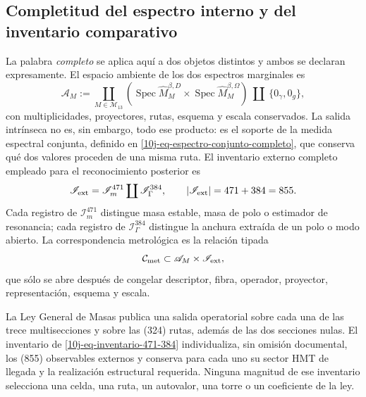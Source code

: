 \subsection{Completitud del espectro interno y del inventario comparativo}

La palabra \emph{completo} se aplica aquí a dos objetos distintos y ambos se
declaran expresamente. El espacio ambiente de los dos espectros marginales es
\begin{equation}
 \mathscr A_M:=
 \coprod_{M\in\mathcal M_{13}}
 \left(
  \operatorname{Spec}\widehat M_M^{\beta,D}
  \times
  \operatorname{Spec}\widehat M_M^{\beta,\Omega}
 \right)
 \ \coprod\ \{0_\gamma,0_g\},
 \label{10j-eq-espectro-interno-completo}
\end{equation}
con multiplicidades, proyectores, rutas, esquema y escala conservados. La
salida intrínseca no es, sin embargo, todo ese producto: es el soporte de la
medida espectral conjunta, definido en
\eqref{10j-eq-espectro-conjunto-completo}, que conserva qué dos valores
proceden de una misma ruta. El inventario externo completo empleado para el
reconocimiento posterior es
\begin{equation}
 \mathscr I_{\rm ext}
 =\mathscr I_m^{471}\coprod\mathscr I_\Gamma^{384},
 \qquad |\mathscr I_{\rm ext}|=471+384=855.
 \label{10j-eq-inventario-471-384}
\end{equation}
Cada registro de \(\mathscr I_m^{471}\) distingue masa estable, masa de polo o
estimador de resonancia; cada registro de \(\mathscr I_\Gamma^{384}\)
distingue la anchura extraída de un polo o modo abierto. La correspondencia
metrológica es la relación tipada
\begin{equation}
 \mathcal C_{\rm met}
 \subset
 \mathscr A_M\times\mathscr I_{\rm ext},
 \label{10j-eq-correspondencia-metrologica-completa}
\end{equation}
que sólo se abre después de congelar descriptor, fibra, operador, proyector,
representación, esquema y escala.

\begin{theorem}
\label{10j-thm-doble-completitud}
La Ley General de Masas publica una salida operatorial sobre cada una de las
trece multisecciones y sobre las (324) rutas, además de las dos secciones
nulas. El inventario de \eqref{10j-eq-inventario-471-384} individualiza, sin
omisión documental, los (855) observables externos y conserva para cada uno
su sector HMT de llegada y la realización estructural requerida. Ninguna
magnitud de ese inventario selecciona una celda, una ruta, un autovalor, una
torre o un coeficiente de la ley.
\end{theorem}

